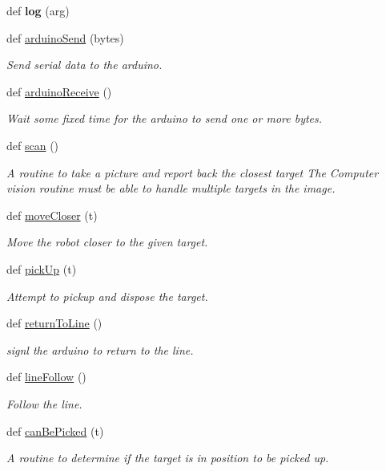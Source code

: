 \begin{DoxyCompactItemize}
\item 
\mbox{\label{namespaceSyringenator_a263a26fdb4da94f277fb51f3e740f30d}} 
def {\bfseries log} (arg)
\item 
def \mbox{\hyperlink{namespaceSyringenator_ae7978d5b84170226249d8de2e204e762}{arduino\+Send}} (bytes)
\begin{DoxyCompactList}\small\item\em Send serial data to the arduino. \end{DoxyCompactList}\item 
def \mbox{\hyperlink{namespaceSyringenator_a1c5a8cf020e400c8c0337977a5b6d921}{arduino\+Receive}} ()
\begin{DoxyCompactList}\small\item\em Wait some fixed time for the arduino to send one or more bytes. \end{DoxyCompactList}\item 
def \mbox{\hyperlink{namespaceSyringenator_aff01237d3ff3e33f0ffc32927d813df0}{scan}} ()
\begin{DoxyCompactList}\small\item\em A routine to take a picture and report back the closest target The Computer vision routine must be able to handle multiple targets in the image. \end{DoxyCompactList}\item 
def \mbox{\hyperlink{namespaceSyringenator_a6aecf5518c352d012eb1422d9970146d}{move\+Closer}} (t)
\begin{DoxyCompactList}\small\item\em Move the robot closer to the given target. \end{DoxyCompactList}\item 
def \mbox{\hyperlink{namespaceSyringenator_a9409dbfa8ede969288bb659ef23befb6}{pick\+Up}} (t)
\begin{DoxyCompactList}\small\item\em Attempt to pickup and dispose the target. \end{DoxyCompactList}\item 
def \mbox{\hyperlink{namespaceSyringenator_afe04905c8a4a9d077457422866633203}{return\+To\+Line}} ()
\begin{DoxyCompactList}\small\item\em signl the arduino to return to the line. \end{DoxyCompactList}\item 
def \mbox{\hyperlink{namespaceSyringenator_a824ef6e71bc0975483435ffbdd58cb3e}{line\+Follow}} ()
\begin{DoxyCompactList}\small\item\em Follow the line. \end{DoxyCompactList}\item 
def \mbox{\hyperlink{namespaceSyringenator_acb08d40f080a03cb4e7a43ee3ab4854b}{can\+Be\+Picked}} (t)
\begin{DoxyCompactList}\small\item\em A routine to determine if the target is in position to be picked up. \end{DoxyCompactList}\end{DoxyCompactItemize}
